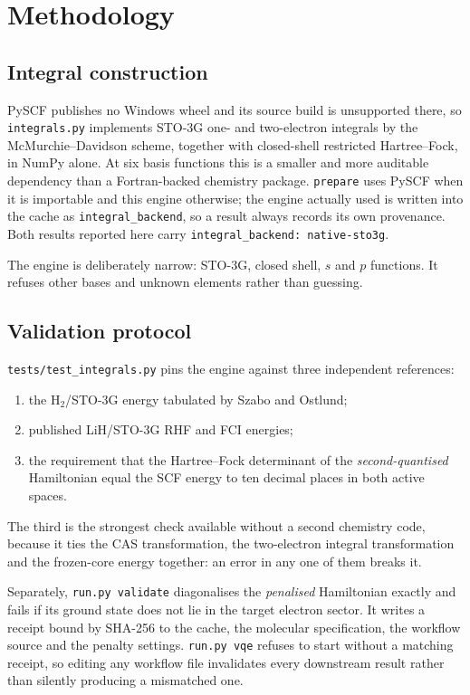 \documentclass[11pt,a4paper]{article}
\newcommand{\code}[1]{\texttt{\small #1}}
\begin{document}
\section{Methodology}

\subsection{Integral construction}

PySCF publishes no Windows wheel and its source build is unsupported there, so
\code{integrals.py} implements STO-3G one- and two-electron integrals by the
McMurchie--Davidson scheme, together with closed-shell restricted Hartree--Fock,
in NumPy alone. At six basis functions this is a smaller and more auditable
dependency than a Fortran-backed chemistry package. \code{prepare} uses PySCF
when it is importable and this engine otherwise; the engine actually used is
written into the cache as \code{integral\_backend}, so a result always records
its own provenance. Both results reported here carry
\code{integral\_backend: native-sto3g}.

The engine is deliberately narrow: STO-3G, closed shell, $s$ and $p$ functions.
It refuses other bases and unknown elements rather than guessing.

\subsection{Validation protocol}

\code{tests/test\_integrals.py} pins the engine against three independent
references:

\begin{enumerate}[leftmargin=1.4em,itemsep=0.15em]
\item the H$_2$/STO-3G energy tabulated by Szabo and Ostlund;
\item published LiH/STO-3G RHF and FCI energies;
\item the requirement that the Hartree--Fock determinant of the
  \emph{second-quantised} Hamiltonian equal the SCF energy to ten decimal places
  in both active spaces.
\end{enumerate}

The third is the strongest check available without a second chemistry code,
because it ties the CAS transformation, the two-electron integral
transformation and the frozen-core energy together: an error in any one of them
breaks it.

Separately, \code{run.py validate} diagonalises the \emph{penalised} Hamiltonian
exactly and fails if its ground state does not lie in the target electron
sector. It writes a receipt bound by SHA-256 to the cache, the molecular
specification, the workflow source and the penalty settings. \code{run.py vqe}
refuses to start without a matching receipt, so editing any workflow file
invalidates every downstream result rather than silently producing a
mismatched one.
\end{document}
